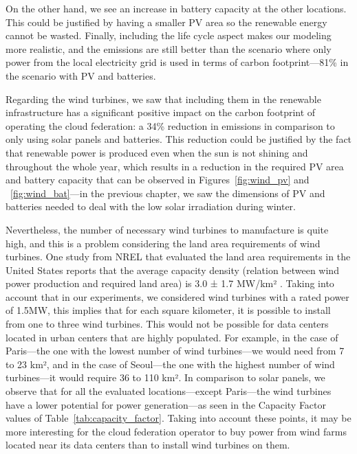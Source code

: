 On the other hand, we see an increase in battery capacity at the other locations. This could be justified by having a smaller PV area so the renewable energy cannot be wasted. Finally, including the life cycle aspect makes our modeling more realistic, and the emissions are still better than the scenario where only power from the local electricity grid is used in terms of carbon footprint---81\% in the scenario with PV and batteries.  


Regarding the wind turbines, we saw that including them in the renewable infrastructure has a significant positive impact on the carbon footprint of operating the cloud federation: a 34\% reduction in  emissions in comparison to only using solar panels and batteries. This reduction could be justified by the fact that renewable power is produced even when the sun is not shining and throughout the whole year, which results in a reduction in the required PV area and battery capacity that can be observed in Figures~\ref{fig:wind_pv} and ~\ref{fig:wind_bat}---in the previous chapter, we saw the dimensions of PV and batteries needed to deal with the low solar irradiation during winter.

Nevertheless, the number of necessary wind turbines to manufacture is quite high, and this is a problem considering the land area requirements of wind turbines. One study from NREL that evaluated the land area requirements in the United States reports that the average capacity density (relation between wind power production and required land area) is 3.0 ± 1.7 MW/km² \cite{wtlanduse_2009}. Taking into account that in our experiments, we considered wind turbines with a rated power of 1.5MW, this implies that for each square kilometer, it is possible to install from one to three wind turbines. This would not be possible for data centers located in urban centers that are highly populated. For example, in the case of Paris---the one with the lowest number of wind turbines---we would need from 7 to 23 km², and in the case of Seoul---the one with the highest number of wind turbines---it would require 36 to 110 km². In comparison to solar panels, we observe that for all the evaluated locations---except Paris---the wind turbines have a lower potential for power generation---as seen in the Capacity Factor values of Table~\ref{tab:capacity_factor}. Taking into account these points, it may be more interesting for the cloud federation operator to buy power from wind farms located near its data centers than to install wind turbines on them.

